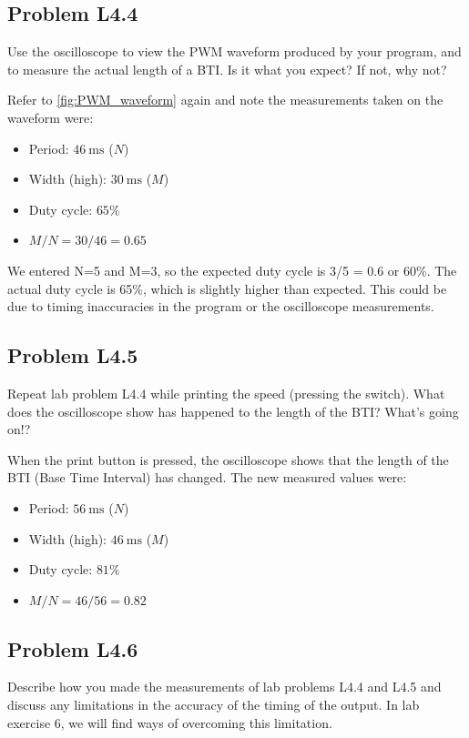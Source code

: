 \documentclass[10pt,twocolumn]{article}
\begin{document}
\subsection{Problem L4.4}
Use the oscilloscope to view the PWM waveform produced by
your program, and to measure the actual length of a BTI. Is it what you expect? If
not, why not?

\vspace{\baselineskip}
Refer to \autoref{fig:PWM_waveform} again and note the measurements taken on the waveform were:
\begin{itemize}
	\item Period: $46\ \mathrm{ms}$ ($N$)
	\item Width (high): $30\ \mathrm{ms}$ ($M$)
	\item Duty cycle: $65\%$
	\item $M/N = 30/46 = 0.65$
\end{itemize}

We entered N=5 and M=3, so the expected duty cycle is 3/5 = 0.6 or 60\%. 
The actual duty cycle is 65\%, which is slightly higher than expected. This could be due to timing inaccuracies in the program or the oscilloscope measurements.


\subsection{Problem L4.5}
Repeat lab problem L4.4 while printing the speed (pressing
the switch). What does the oscilloscope show has happened to the length of the
BTI? What's going on!?

\vspace{\baselineskip}

When the print button is pressed, the oscilloscope shows that the length of the BTI (Base Time Interval) has changed. 
The new measured values were:
\begin{itemize}
	\item Period: $56\ \mathrm{ms}$ ($N$)
	\item Width (high): $46\ \mathrm{ms}$ ($M$)
	\item Duty cycle: $81\%$
	\item $M/N = 46/56 = 0.82$
\end{itemize}

\subsection{Problem L4.6}
Describe how you made the measurements of lab problems L4.4
and L4.5 and discuss any limitations in the accuracy of the timing of the output. In
lab exercise 6, we will find ways of overcoming this limitation.
\end{document}
